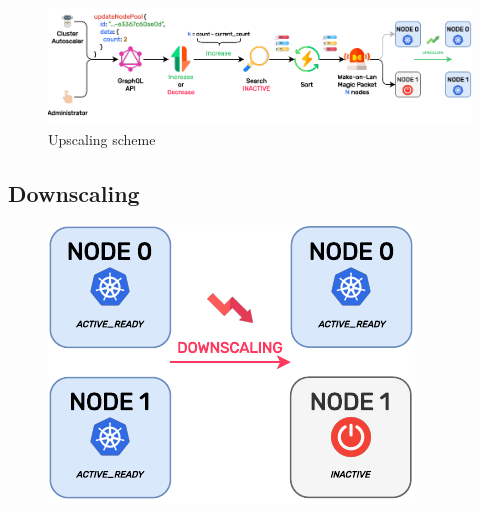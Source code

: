 \begin{figure}[htbp]
  \centering
  \includegraphics[width=\textwidth]{images/implementation/upscaling_schema.pdf}
  \caption{Upscaling scheme}
  \label{fig:upscaling}
\end{figure}

\subsection{Downscaling}
\label{subsec:implementation_server_downscaling}

\begin{figure}
  \centering
  \includegraphics[width=\linewidth]{images/implementation/downscaling.pdf}
\end{figure}

